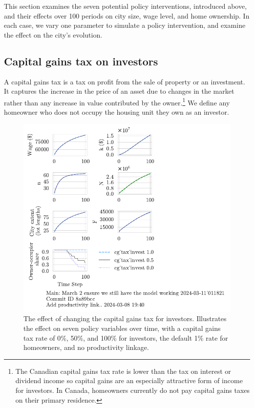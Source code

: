 This section examines the seven potential policy interventions, introduced above, and their effects over 100 periods on city size, wage level, and home ownership. In each case, we vary one parameter to simulate a policy  intervention, %
and examine the effect on the city's evolution.

\subsection{Capital gains tax on investors}
A \gls{capital gains} tax is a tax on profit from the sale of property or an investment. It captures the increase in the price of an asset due to changes in the market rather than any increase in value contributed by the owner.\footnote{The Canadian capital gains tax rate is lower than the tax on interest or dividend income so capital gains are an especially attractive form of income for investors. In Canada, homeowners currently do not pay capital gains taxes on their primary residence. %
} We define any homeowner who does not occupy the housing unit they own as an investor. 

\begin{figure}[!hbtp]
\centering
\includegraphics[scale=1.1, trim={0 1.4cm 4cm 0},clip]{fig/cg_tax_invest-Main-011821.pdf}
\caption[The effect of changing the capital gains tax for investors]{The effect of changing the capital gains tax for investors. Illustrates the effect on seven policy variables over time, with a capital gains tax rate of 0\%, 50\%, and 100\% for investors, the default 1\% rate for homeowners, and no productivity linkage.}
\label{fig:CGinvest_ownership_trajectory}
\end{figure}



